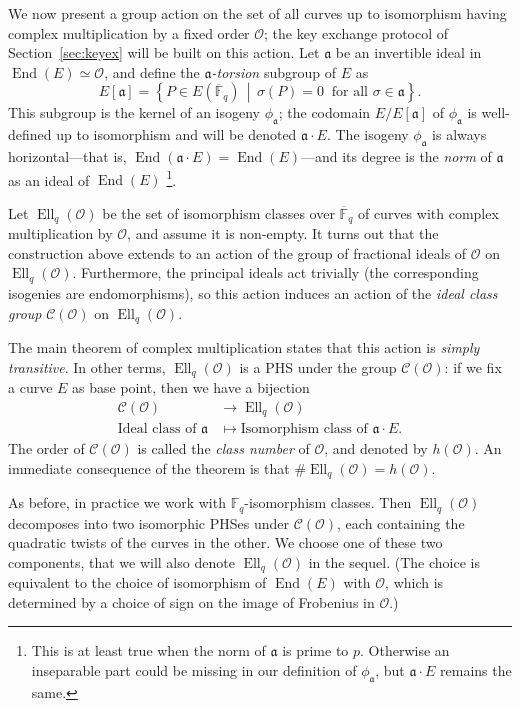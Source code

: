 \documentclass{llncs}
\newcommand{\F}{\mathbb{F}}
\newcommand{\Fbar}{\overline{\mathbb{F}}}
\newcommand{\Cl}{\mathcal{C}}
\renewcommand{\O}{\mathcal{O}}
\newcommand{\set}[1]{\left\{#1\right\}}
\newcommand{\suchthat}{\,\middle\vert\,}
\renewcommand{\frak}{\mathfrak}
\DeclareMathOperator{\End}{End}
\DeclareMathOperator{\Ell}{Ell}
\begin{document}
We now present a group action on the set of all curves 
up to isomorphism having complex
multiplication by a fixed order $\O$; the key exchange protocol of
Section~\ref{sec:keyex} will be built on this action. Let $\frak a$ be
an invertible ideal in $\End(E)≃\O$, and define the
\emph{${\frak a}$-torsion} subgroup of $E$ as
\[
E[\frak a] = \set{P\in E(\Fbar_q) \suchthat σ(P) = 0\ 
\text{ for all }σ\in\frak a}.
\]
This subgroup is the kernel of an isogeny $\phi_{\frak a}$;
the codomain $E/E[\frak a]$ of $\phi_{\frak a}$ is well-defined up to isomorphism
and will be denoted $\frak a\cdot E$.
The isogeny $\phi_{\frak a}$ is
always horizontal---that is, $\End(\frak a \cdot E) = \End(E)$---and its
degree is the \emph{norm} of $\frak a$ as an ideal of $\End(E)$ \footnote{This is at least true when the norm of $\frak a$ is prime to $p$. Otherwise an inseparable part could be missing in our definition of $\phi_{\frak a}$, but $\frak a\cdot E$ remains the same.}.

Let $\Ell_q(\O)$ be the set of isomorphism classes over $\Fbar_q$
of curves with complex multiplication by $\O$, and assume it is non-empty. 
It turns out that the construction above extends
to an action of the group of fractional ideals of $\O$ on $\Ell_q(\O)$.
Furthermore, the principal ideals act trivially 
(the corresponding isogenies are endomorphisms), 
so this action induces an action of the \emph{ideal
class group} $\Cl(\O)$ on $\Ell_q(\O)$.

The main theorem of complex
multiplication states that this action is \emph{simply transitive}. In
other terms, $\Ell_q(\O)$ is a PHS
under the group $\Cl(\O)$: if we fix a curve $E$ as base point,
then we have a bijection
\[
\begin{aligned}
\Cl(\O) &\longrightarrow \Ell_q(\O) \\
\text{Ideal class of }\frak a &\longmapsto \text{Isomorphism class of }\frak a\cdot E.
\end{aligned}
\]
The order of $\Cl(\O)$ is called the \emph{class number} of $\O$, and
denoted by $h(\O)$. An immediate consequence of the theorem is that
$\#\Ell_q(\O)=h(\O)$.

As before, in practice we work with $\F_q$-isomorphism classes.
Then $\Ell_q(\O)$ decomposes into two isomorphic PHSes under $\Cl(\O)$,
each containing the quadratic twists of the curves in the other. 
We choose one of these
two components, that we will also denote $\Ell_q(\O)$ in the sequel.
(The choice is equivalent to the choice of isomorphism of $\End(E)$ with
$\O$, which is determined by a choice of sign on the image of Frobenius
in $\O$.)
\end{document}
